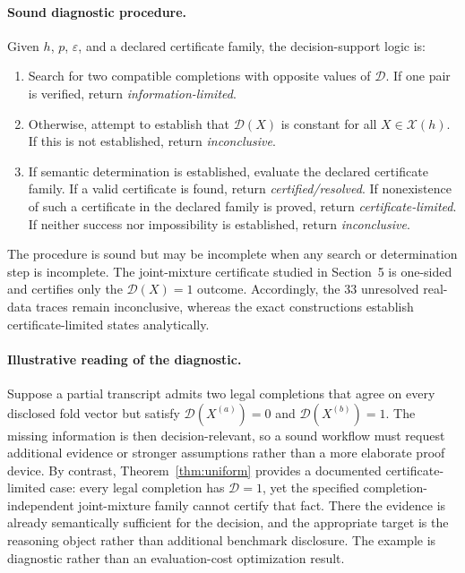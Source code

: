 \documentclass[preprint,11pt]{elsarticle}
\begin{document}
\paragraph{Sound diagnostic procedure.}
Given $h$, $p$, $\varepsilon$, and a declared certificate family, the decision-support logic is:
\begin{enumerate}
\item Search for two compatible completions with opposite values of $\mathcal D$. If one pair is verified, return \emph{information-limited}.
\item Otherwise, attempt to establish that $\mathcal D(X)$ is constant for all $X\in\mathcal X(h)$. If this is not established, return \emph{inconclusive}.
\item If semantic determination is established, evaluate the declared certificate family. If a valid certificate is found, return \emph{certified/resolved}. If nonexistence of such a certificate in the declared family is proved, return \emph{certificate-limited}. If neither success nor impossibility is established, return \emph{inconclusive}.
\end{enumerate}
The procedure is sound but may be incomplete when any search or determination step is incomplete. The joint-mixture certificate studied in Section~5 is one-sided and certifies only the $\mathcal D(X)=1$ outcome. Accordingly, the 33 unresolved real-data traces remain inconclusive, whereas the exact constructions establish certificate-limited states analytically.

\paragraph{Illustrative reading of the diagnostic.}
Suppose a partial transcript admits two legal completions that agree on every disclosed fold vector but satisfy $\mathcal D(X^{(a)})=0$ and $\mathcal D(X^{(b)})=1$. The missing information is then decision-relevant, so a sound workflow must request additional evidence or stronger assumptions rather than a more elaborate proof device. By contrast, Theorem~\ref{thm:uniform} provides a documented certificate-limited case: every legal completion has $\mathcal D=1$, yet the specified completion-independent joint-mixture family cannot certify that fact. There the evidence is already semantically sufficient for the decision, and the appropriate target is the reasoning object rather than additional benchmark disclosure. The example is diagnostic rather than an evaluation-cost optimization result.
\end{document}
